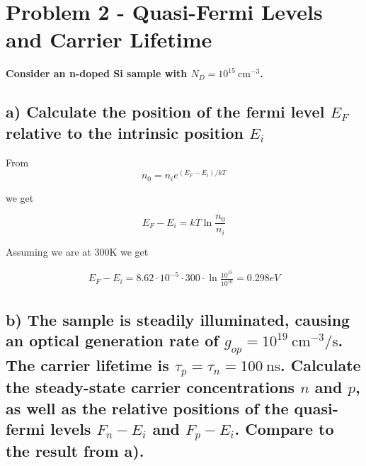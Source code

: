 \section{Problem 2 - Quasi-Fermi Levels and Carrier Lifetime}
\textbf{Consider an n-doped Si sample with \( N_{D}=10^{15} \mathrm{~cm}^{-3} \).}

\subsection*{a) Calculate the position of the fermi level $E_F$ relative to the intrinsic position $E_i$}
From
\begin{equation*}
    n_{0}=n_{i} e^{\left(E_{F}-E_{i}\right) / k T}
\end{equation*}

we get

\begin{equation*}
    E_F-E_i=kT \ln \frac{n_0}{n_i}
\end{equation*}

Assuming we are at 300K we get

\begin{align*}
    E_F-E_i=8.62\cdot10^{-5}\cdot 300\cdot \ln \frac{10^{15}}{10^{10}}=0.298eV
\end{align*}

\begin{figure}[H]
    \centering

\end{figure}

\subsection*{b) The sample is steadily illuminated, causing an optical generation rate of \( g_{o p}=10^{19} \mathrm{~cm}^{-3} / \mathrm{s} \). The carrier lifetime is \( \tau_{p}=\tau_{n}=100 \mathrm{~ns} \). Calculate the steady-state carrier concentrations \( n \) and \( p \), as well as the relative positions of the quasi-fermi levels \( F_{n}-E_{i} \) and \( F_{p}-E_{i} \). Compare to the result from a).}

